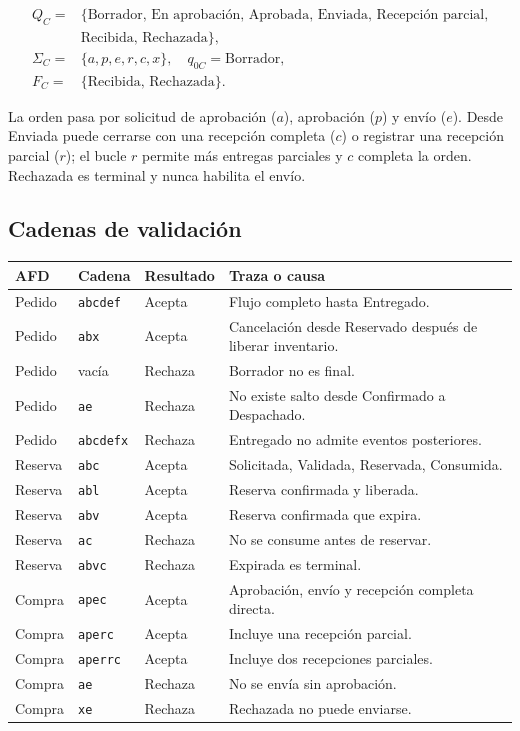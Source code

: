 \documentclass[11pt,a4paper]{article}
\newcommand{\code}[1]{\texttt{#1}}
\begin{document}
\begin{align*}
Q_C={}&\{\text{Borrador, En aprobación, Aprobada, Enviada, Recepción parcial,}\nonumber\\
&\text{Recibida, Rechazada}\},\\
\Sigma_C={}&\{a,p,e,r,c,x\},\quad q_{0C}=\text{Borrador},\\
F_C={}&\{\text{Recibida, Rechazada}\}.
\end{align*}

La orden pasa por solicitud de aprobación ($a$), aprobación ($p$) y envío ($e$). Desde Enviada puede cerrarse con una recepción completa ($c$) o registrar una recepción parcial ($r$); el bucle $r$ permite más entregas parciales y $c$ completa la orden. Rechazada es terminal y nunca habilita el envío.

\subsection{Cadenas de validación}

\begin{longtable}{@{}p{1.7cm}p{1.7cm}p{1.4cm}p{8.5cm}@{}}
\toprule
AFD & Cadena & Resultado & Traza o causa \\ \midrule
\endhead
Pedido & \code{abcdef} & Acepta & Flujo completo hasta Entregado.\\
Pedido & \code{abx} & Acepta & Cancelación desde Reservado después de liberar inventario.\\
Pedido & vacía & Rechaza & Borrador no es final.\\
Pedido & \code{ae} & Rechaza & No existe salto desde Confirmado a Despachado.\\
Pedido & \code{abcdefx} & Rechaza & Entregado no admite eventos posteriores.\\
Reserva & \code{abc} & Acepta & Solicitada, Validada, Reservada, Consumida.\\
Reserva & \code{abl} & Acepta & Reserva confirmada y liberada.\\
Reserva & \code{abv} & Acepta & Reserva confirmada que expira.\\
Reserva & \code{ac} & Rechaza & No se consume antes de reservar.\\
Reserva & \code{abvc} & Rechaza & Expirada es terminal.\\
Compra & \code{apec} & Acepta & Aprobación, envío y recepción completa directa.\\
Compra & \code{aperc} & Acepta & Incluye una recepción parcial.\\
Compra & \code{aperrc} & Acepta & Incluye dos recepciones parciales.\\
Compra & \code{ae} & Rechaza & No se envía sin aprobación.\\
Compra & \code{xe} & Rechaza & Rechazada no puede enviarse.\\
\bottomrule
\end{longtable}
\end{document}
